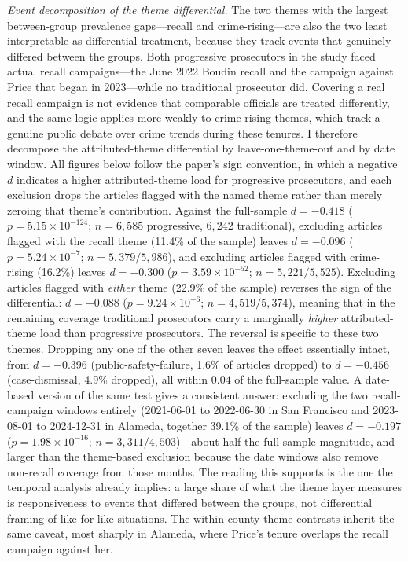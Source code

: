 \documentclass[12pt, letterpaper]{article}
\begin{document}
\emph{Event decomposition of the theme differential.} The two themes with the largest between-group prevalence gaps---recall and crime-rising---are also the two least interpretable as differential treatment, because they track events that genuinely differed between the groups. Both progressive prosecutors in the study faced actual recall campaigns---the June 2022 Boudin recall and the campaign against Price that began in 2023---while no traditional prosecutor did. Covering a real recall campaign is not evidence that comparable officials are treated differently, and the same logic applies more weakly to crime-rising themes, which track a genuine public debate over crime trends during these tenures. I therefore decompose the attributed-theme differential by leave-one-theme-out and by date window. All figures below follow the paper's sign convention, in which a negative $d$ indicates a higher attributed-theme load for progressive prosecutors, and each exclusion drops the articles flagged with the named theme rather than merely zeroing that theme's contribution. Against the full-sample $d = -0.418$ ($p = 5.15 \times 10^{-124}$; $n = 6{,}585$ progressive, $6{,}242$ traditional), excluding articles flagged with the recall theme (11.4\% of the sample) leaves $d = -0.096$ ($p = 5.24 \times 10^{-7}$; $n = 5{,}379 / 5{,}986$), and excluding articles flagged with crime-rising (16.2\%) leaves $d = -0.300$ ($p = 3.59 \times 10^{-52}$; $n = 5{,}221 / 5{,}525$). Excluding articles flagged with \emph{either} theme (22.9\% of the sample) reverses the sign of the differential: $d = +0.088$ ($p = 9.24 \times 10^{-6}$; $n = 4{,}519 / 5{,}374$), meaning that in the remaining coverage traditional prosecutors carry a marginally \emph{higher} attributed-theme load than progressive prosecutors. The reversal is specific to these two themes. Dropping any one of the other seven leaves the effect essentially intact, from $d = -0.396$ (public-safety-failure, 1.6\% of articles dropped) to $d = -0.456$ (case-dismissal, 4.9\% dropped), all within $0.04$ of the full-sample value. A date-based version of the same test gives a consistent answer: excluding the two recall-campaign windows entirely (2021-06-01 to 2022-06-30 in San Francisco and 2023-08-01 to 2024-12-31 in Alameda, together 39.1\% of the sample) leaves $d = -0.197$ ($p = 1.98 \times 10^{-16}$; $n = 3{,}311 / 4{,}503$)---about half the full-sample magnitude, and larger than the theme-based exclusion because the date windows also remove non-recall coverage from those months. The reading this supports is the one the temporal analysis already implies: a large share of what the theme layer measures is responsiveness to events that differed between the groups, not differential framing of like-for-like situations. The within-county theme contrasts inherit the same caveat, most sharply in Alameda, where Price's tenure overlaps the recall campaign against her.
\end{document}
